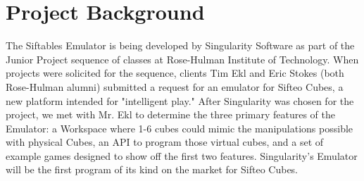 \documentclass[12pt]{article}
\begin{document}
\section{Project Background}
The Siftables Emulator is being developed by Singularity Software as part of the Junior Project sequence of classes at Rose-Hulman Institute of Technology. When projects were solicited for the sequence, clients Tim Ekl and Eric Stokes (both Rose-Hulman alumni) submitted a request for an emulator for Sifteo Cubes, a new platform intended for "intelligent play." After Singularity was chosen for the project, we met with Mr. Ekl to determine the three primary features of the Emulator: a Workspace where 1-6 cubes could mimic the manipulations possible with physical Cubes, an \gls{API} to program those virtual cubes, and a set of example games designed to show off the first two features. Singularity's Emulator will be the first program of its kind on the market for Sifteo Cubes.

\appendix
\end{document}
